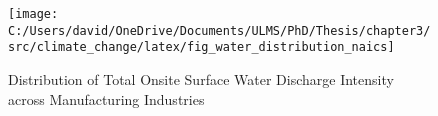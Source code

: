 \begin{figure}[H]
    \centering
    \texttt{[image: C:/Users/david/OneDrive/Documents/ULMS/PhD/Thesis/chapter3/src/climate\_change/latex/fig\_water\_distribution\_naics]}
    \caption{Distribution of Total Onsite Surface Water Discharge Intensity across Manufacturing Industries}
    \label{fig:water-discharge-distribution-naics}
\end{figure}